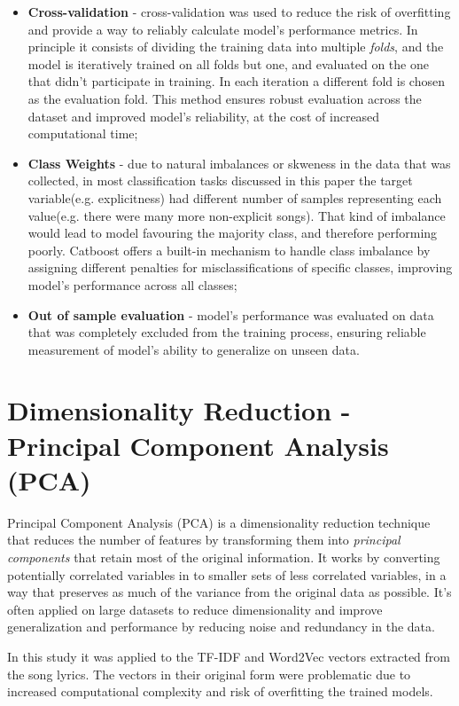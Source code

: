 \begin{itemize}
  \item \textbf{Cross-validation} - cross-validation was used to reduce the
    risk of overfitting and provide a way to reliably calculate model's
    performance metrics. In principle it consists of dividing the training
    data into multiple \textit{folds}, and the model is iteratively trained
    on all folds but one, and evaluated on the one that didn't participate in
    training. In each iteration a different fold is chosen as the evaluation
    fold. This method ensures robust evaluation across the dataset and improved
    model's reliability, at the cost of increased computational time;
  \item \textbf{Class Weights} - due to natural imbalances or skweness in the
    data that was collected, in most classification tasks discussed in this
    paper the target variable(e.g. explicitness) had different number of samples
    representing each value(e.g. there were many more non-explicit songs). That
    kind of imbalance would lead to model favouring the majority class, and
    therefore performing poorly. Catboost offers a built-in mechanism to handle
    class imbalance by assigning different penalties for misclassifications
    of specific classes, improving model's performance across all classes;
  \item \textbf{Out of sample evaluation} - model's performance was evaluated
    on data that was completely excluded from the training process, ensuring
    reliable measurement of model's ability to generalize on unseen data.
\end{itemize}

\section{Dimensionality Reduction - Principal Component Analysis (PCA)}
\label{sec:dimensionalityreduction}
Principal Component Analysis (PCA) is a dimensionality reduction technique
that reduces the number of features by transforming them into \textit{principal
components} that retain most of the original information. It works by
converting potentially correlated variables in to smaller sets of less correlated
variables, in a way that preserves as much of the variance from the original
data as possible. It's often applied on large datasets to reduce dimensionality
and improve generalization and performance by reducing noise and redundancy
in the data.\cite{pca}

In this study it was applied to the TF-IDF and Word2Vec vectors extracted from
the song lyrics. The vectors in their original form were problematic due  to
increased computational complexity and risk of overfitting the trained models.

